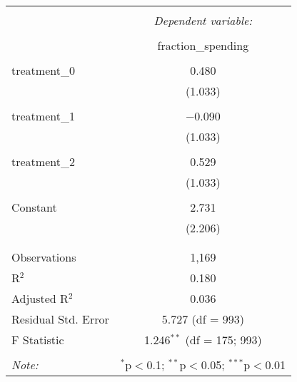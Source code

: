 
\begin{table}[!htbp] \centering 
  \caption{} 
  \label{} 
\begin{tabular}{@{\extracolsep{5pt}}lc} 
\\[-1.8ex]\hline 
\hline \\[-1.8ex] 
 & \multicolumn{1}{c}{\textit{Dependent variable:}} \\ 
\cline{2-2} 
\\[-1.8ex] & fraction\_spending \\ 
\hline \\[-1.8ex] 
 treatment\_0 & 0.480 \\ 
  & (1.033) \\ 
  & \\ 
 treatment\_1 & $-$0.090 \\ 
  & (1.033) \\ 
  & \\ 
 treatment\_2 & 0.529 \\ 
  & (1.033) \\ 
  & \\ 
 Constant & 2.731 \\ 
  & (2.206) \\ 
  & \\ 
\hline \\[-1.8ex] 
Observations & 1,169 \\ 
R$^{2}$ & 0.180 \\ 
Adjusted R$^{2}$ & 0.036 \\ 
Residual Std. Error & 5.727 (df = 993) \\ 
F Statistic & 1.246$^{**}$ (df = 175; 993) \\ 
\hline 
\hline \\[-1.8ex] 
\textit{Note:}  & \multicolumn{1}{r}{$^{*}$p$<$0.1; $^{**}$p$<$0.05; $^{***}$p$<$0.01} \\ 
\end{tabular} 
\end{table} 
